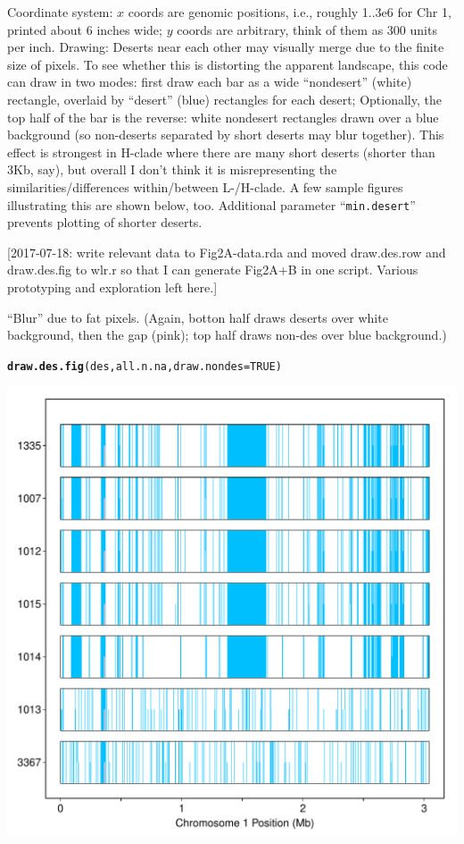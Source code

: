 \documentclass{article}\usepackage[]{graphicx}\usepackage[]{color}
\makeatletter
\def\maxwidth{ %
  \ifdim\Gin@nat@width>\linewidth
    \linewidth
  \else
    \Gin@nat@width
  \fi
}
\newcommand{\hlnum}[1]{\textcolor[rgb]{0.686,0.059,0.569}{#1}}%
\newcommand{\hlstd}[1]{\textcolor[rgb]{0.345,0.345,0.345}{#1}}%
\newcommand{\hlkwc}[1]{\textcolor[rgb]{0.333,0.667,0.333}{#1}}%
\newcommand{\hlkwd}[1]{\textcolor[rgb]{0.737,0.353,0.396}{\textbf{#1}}}%
\newenvironment{kframe}{%
 \def\at@end@of@kframe{}%
 \ifinner\ifhmode%
  \def\at@end@of@kframe{\end{minipage}}%
  \begin{minipage}{\columnwidth}%
 \fi\fi%
 \def\FrameCommand##1{\hskip\@totalleftmargin \hskip-\fboxsep
 \colorbox{shadecolor}{##1}\hskip-\fboxsep
     \hskip-\linewidth \hskip-\@totalleftmargin \hskip\columnwidth}%
 \MakeFramed {\advance\hsize-\width
   \@totalleftmargin\z@ \linewidth\hsize
   \@setminipage}}%
 {\par\unskip\endMakeFramed%
 \at@end@of@kframe}
\newenvironment{knitrout}{}{} %
\makeatother
\begin{document}
Coordinate system: $x$ coords are genomic positions, i.e., roughly 1..3e6 for Chr 1, printed about 6 inches wide; $y$ coords are arbitrary, think of them as 300 units per inch.  Drawing:  Deserts near each other may visually merge due to the finite size of pixels. To see whether this is distorting the apparent landscape, this code can draw in two modes: first draw each bar as a wide ``nondesert'' (white) rectangle, overlaid by ``desert'' (blue) rectangles for each desert; Optionally, the top half of the bar is the reverse: white nondesert rectangles drawn over a blue background (so non-deserts separated by short deserts may blur together).  This effect is strongest in H-clade where there are many short deserts (shorter than 3Kb, say), but overall I don't think it is misrepresenting the similarities/differences within/between L-/H-clade.  A few sample figures illustrating this are shown below, too.  Additional parameter ``\texttt{min.desert}'' prevents plotting of shorter deserts.

[2017-07-18: write relevant data to Fig2A-data.rda and moved draw.des.row and draw.des.fig to wlr.r so that I can generate Fig2A+B in one script. Various prototyping and exploration left here.]

``Blur'' due to fat pixels.  (Again, botton half draws deserts over white background, then the gap (pink); top half draws non-des over blue background.)

\begin{knitrout}\footnotesize
{}\color{fgcolor}\begin{kframe}
\begin{alltt}
\hlkwd{draw.des.fig}\hlstd{(des, all.n.na,} \hlkwc{draw.nondes}\hlstd{=}\hlnum{TRUE}\hlstd{)}
\end{alltt}
\end{kframe}
\includegraphics[width=\maxwidth]{Fig2A-desert-distribution-figs-knitr/unnamed-chunk-22-1} 

\end{knitrout}
\end{document}
